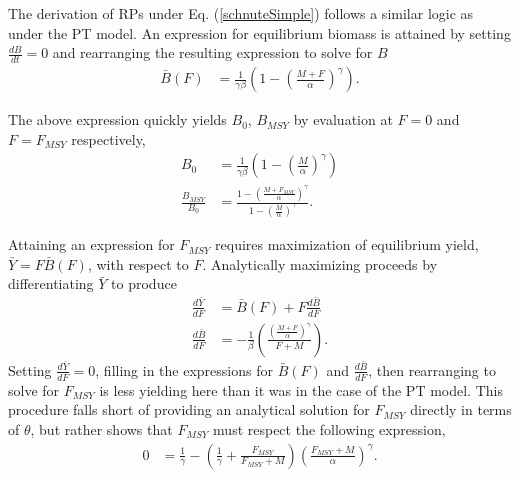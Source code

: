 \documentclass[12pt]{article}
\begin{document}


%
The derivation of RPs under Eq. (\ref{schnuteSimple}) follows a similar logic 
as under the PT model. An expression for equilibrium biomass is attained by 
setting $\frac{dB}{dt}=0$ and rearranging the resulting expression to solve 
for $B$ 
%
\begin{align}
\bar{B}(F) &= \frac{1}{\gamma \beta}\left(1-\left(\frac{M+F}{\alpha}\right)^\gamma\right).
\label{BsEq}
\end{align}

%
The above expression quickly yields $B_0$, $B_{MSY}$ by evaluation at $F=0$ and $F=F_{MSY}$ respectively,
\begin{align}
B_0 &= \frac{1}{\gamma \beta}\left(1-\left(\frac{M}{\alpha}\right)^\gamma\right) \label{B0S}\\
\frac{B_{MSY}}{B_0} &= \frac{1-\left(\frac{M+F_{MSY}}{\alpha}\right)^\gamma}{ 1-\left(\frac{M}{\alpha}\right)^\gamma }. \label{BratS}
\end{align}

%
Attaining an expression for $F_{MSY}$ requires maximization of equilibrium 
yield, \mbox{$\bar{Y}=F\bar{B}(F)$}, with respect to $F$. Analytically maximizing 
proceeds by differentiating $\bar{Y}$ to produce
%
\begin{align}
\frac{d \bar{Y}}{dF} &= \bar B(F) + F \frac{d \bar B}{dF} \label{FderivS}\\
\frac{d \bar B}{dF} &= -\frac{1}{\beta}  \left(\frac{\left(\frac{M+F}{\alpha}\right)^\gamma}{F+M}\right)\label{dBdFS}.
\end{align}
%
Setting $\frac{d \bar{Y}}{dF}=0$, filling in the expressions for $\bar B(F)$ 
and $\frac{d \bar B}{dF}$, then rearranging to solve for $F_{MSY}$ is less 
yielding here than it was in the case of the PT model. This procedure falls 
short of providing an analytical solution for $F_{MSY}$ directly in terms of 
$\theta$, %
but rather shows that $F_{MSY}$ must respect the following expression,  
%
\begin{align}\label{FmsyS}
0 &= \frac{1}{\gamma} - \left(\frac{1}{\gamma} + \frac{F_{MSY}}{F_{MSY}+M}\right)\left(\frac{F_{MSY}+M}{\alpha}\right)^\gamma.  
\end{align}
\end{document}
